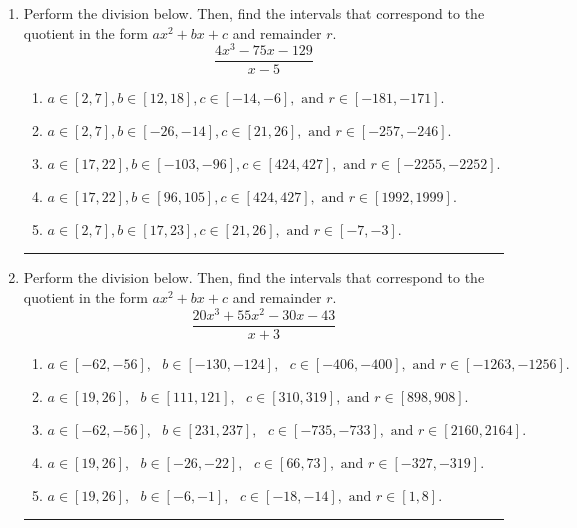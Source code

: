 \documentclass[14pt]{extbook}
\newcommand{\litem}[1]{\item#1\hspace*{-1cm}\rule{\textwidth}{0.4pt}}
\begin{document}
\begin{enumerate}
{\begin{enumerate}[label=\Alph*.]
\end{enumerate} }
\litem{
Perform the division below. Then, find the intervals that correspond to the quotient in the form $ax^2+bx+c$ and remainder $r$.\[ \frac{4x^{3} -75 x -129}{x -5} \]\begin{enumerate}[label=\Alph*.]
\item \( a \in [2, 7], b \in [12, 18], c \in [-14, -6], \text{ and } r \in [-181, -171]. \)
\item \( a \in [2, 7], b \in [-26, -14], c \in [21, 26], \text{ and } r \in [-257, -246]. \)
\item \( a \in [17, 22], b \in [-103, -96], c \in [424, 427], \text{ and } r \in [-2255, -2252]. \)
\item \( a \in [17, 22], b \in [96, 105], c \in [424, 427], \text{ and } r \in [1992, 1999]. \)
\item \( a \in [2, 7], b \in [17, 23], c \in [21, 26], \text{ and } r \in [-7, -3]. \)

\end{enumerate} }
\litem{
Perform the division below. Then, find the intervals that correspond to the quotient in the form $ax^2+bx+c$ and remainder $r$.\[ \frac{20x^{3} +55 x^{2} -30 x -43}{x + 3} \]\begin{enumerate}[label=\Alph*.]
\item \( a \in [-62, -56], \text{   } b \in [-130, -124], \text{   } c \in [-406, -400], \text{   and   } r \in [-1263, -1256]. \)
\item \( a \in [19, 26], \text{   } b \in [111, 121], \text{   } c \in [310, 319], \text{   and   } r \in [898, 908]. \)
\item \( a \in [-62, -56], \text{   } b \in [231, 237], \text{   } c \in [-735, -733], \text{   and   } r \in [2160, 2164]. \)
\item \( a \in [19, 26], \text{   } b \in [-26, -22], \text{   } c \in [66, 73], \text{   and   } r \in [-327, -319]. \)
\item \( a \in [19, 26], \text{   } b \in [-6, -1], \text{   } c \in [-18, -14], \text{   and   } r \in [1, 8]. \)


\end{enumerate}}
\end{enumerate}
\end{document}

